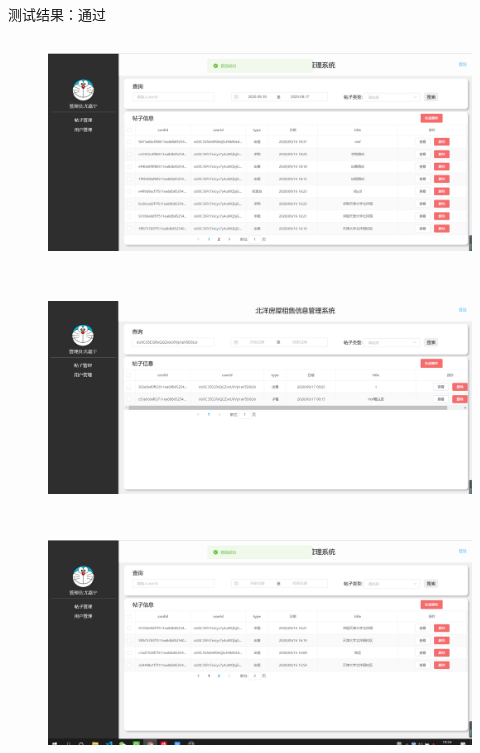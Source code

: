测试结果：通过
\begin{figure}[htbp]
    \centering
    \begin{minipage}[t]{0.9\textwidth}
    \centering
    \includegraphics[width=12cm,height=6cm]{test/image/adm8.png} 
    \end{minipage}
    \end{figure} 
    \newpage 
    \begin{figure}[htbp]
        \centering
        \begin{minipage}[t]{0.9\textwidth}
        \centering
        \includegraphics[width=12cm,height=6cm]{test/image/adm9.png} 
        \end{minipage}
        \end{figure}
        \newpage          
        \begin{figure}[htbp]
            \centering
            \begin{minipage}[t]{0.9\textwidth}
            \centering
            \includegraphics[width=12cm,height=6cm]{test/image/adm10.png} 
            \end{minipage}
            \end{figure}  
            \newpage                            
